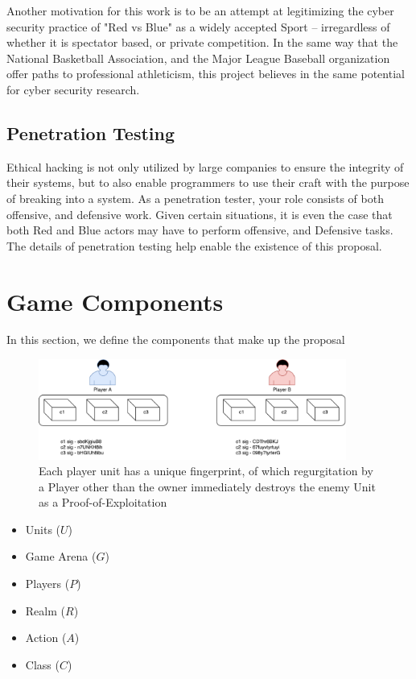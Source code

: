 \documentclass[10pt, titlepage, twocolumn]{article}
\newcommand{\ii}{\indent\indent}
\begin{document}
Another motivation for this work is to be an attempt at legitimizing the cyber security practice of "Red vs Blue" as a widely accepted Sport -- irregardless of whether it is spectator based, or private competition. In the same way that the National Basketball Association, and the Major League Baseball organization offer paths to professional athleticism, this project believes in the same potential for cyber security research.

\subsection{Penetration Testing}
\ii
Ethical hacking is not only utilized by large companies to ensure the integrity of their systems, but to also enable programmers to use their craft with the purpose of breaking into a system. As a penetration tester, your role consists of both offensive, and defensive work. Given certain situations, it is even the case that both Red and Blue actors may have to perform offensive, and Defensive tasks. The details of penetration testing help enable the existence of this proposal.  



\section{Game Components}

In this section, we define the components that make up the proposal

\begin{figure}[ht]
\centering
	\includegraphics[width=0.9\textwidth]{playerCaptureFlag}
	\caption{Each player unit has a unique fingerprint, of which regurgitation by a Player other than the owner immediately destroys the enemy Unit as a Proof-of-Exploitation}
	\label{decentralized}
\end{figure}


\begin{itemize}
	\item Units (\(U\))
	\item Game Arena (\(G\))
	\item Players (\(P\))
	\item Realm (\(R\))
	\item Action (\(A\))
	\item Class (\(C\))
\end{itemize}
\end{document}
